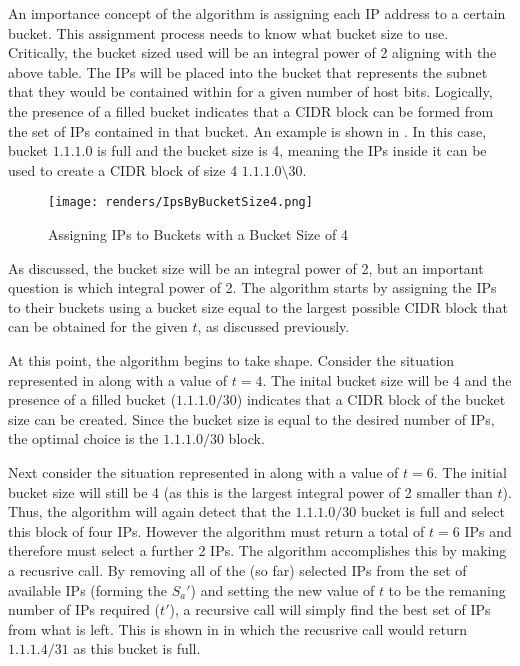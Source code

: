 An importance concept of the algorithm is assigning each IP address to a certain bucket. This assignment process needs to know what bucket size to use. Critically, the bucket sized used will be an integral power of 2 aligning with the above table. The IPs will be placed into the bucket that represents the subnet that they would be contained within for a given number of host bits. Logically, the presence of a filled bucket indicates that a CIDR block can be formed from the set of IPs contained in that bucket. An example is shown in . In this case, bucket $1.1.1.0$ is full and the bucket size is 4, meaning the IPs inside it can be used to create a CIDR block of size 4 $1.1.1.0\setminus30$.

\begin{figure}[H]
      \centering
      \texttt{[image: renders/IpsByBucketSize4.png]}
      \caption{Assigning IPs to Buckets with a Bucket Size of 4}
      \label{fig:exampleIpsByBucket4}
\end{figure}

As discussed, the bucket size will be an integral power of 2, but an important question is which integral power of 2. The algorithm starts by assigning the IPs to their buckets using a bucket size equal to the largest possible CIDR block that can be obtained for the given $t$, as discussed previously.

At this point, the algorithm begins to take shape. Consider the situation represented in  along with a value of $t = 4$. The inital bucket size will be 4 and the presence of a filled bucket ($1.1.1.0/30$) indicates that a CIDR block of the bucket size can be created. Since the bucket size is equal to the desired number of IPs, the optimal choice is the $1.1.1.0/30$ block.

Next consider the situation represented in  along with a value of $t = 6$. The initial bucket size will still be 4 (as this is the largest integral power of 2 smaller than $t$). Thus, the algorithm will again detect that the $1.1.1.0/30$ bucket is full and select this block of four IPs. However the algorithm must return a total of $t = 6$ IPs and therefore must select a further 2 IPs. The algorithm accomplishes this by making a recusrive call. By removing all of the (so far) selected IPs from the set of available IPs (forming the $S_a'$) and setting the new value of $t$ to be the remaning number of IPs required ($t'$), a recursive call will simply find the best set of IPs from what is left. This is shown in  in which the recusrive call would return $1.1.1.4/31$ as this bucket is full. 

